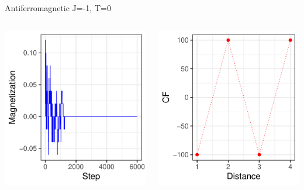 \documentclass{beamer}
\begin{document}
\begin{frame}{Antiferromagnetic J=-1, T=0}
\begin{columns}
\begin{column}{0.5\textwidth}
    \begin{center}
     \includegraphics[width=\textwidth]{Pic/J-1_10_6000_T=0_Magnetization.pdf}
     \end{center}
\end{column}
\begin{column}{0.5\textwidth}
    \begin{center}
     \includegraphics[width=\textwidth]{Pic/J-1_10_6000_T=0_CORRELATION.pdf}

\end{center}
\end{column}
\end{columns}
\end{frame}
\end{document}
